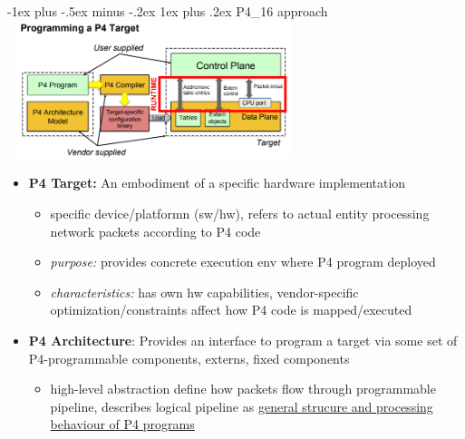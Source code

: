 \documentclass[10pt,landscape]{article}
\makeatletter
\renewcommand{\subsubsection}{\@startsection{subsubsection}{3}{0mm}%
                                {-1ex plus -.5ex minus -.2ex}%
                                {1ex plus .2ex}%
                                {\normalfont\small\bfseries}}
\makeatother
\begin{document}
\begin{multicols*}{3}
\subsubsection{P4\_16 approach}
\includegraphics*[width=8.5cm, height=4cm]{images/programmingp4target.PNG}
\begin{itemize}[topsep=0pt,noitemsep,wide=0pt, leftmargin=\dimexpr{} + 2\relax]
  \item \textbf{P4 Target:} An embodiment of a specific hardware implementation
  \begin{itemize}[topsep=0pt,noitemsep,wide=0pt, leftmargin=\dimexpr{} + 2\relax]
    \item specific device/platformn (sw/hw), refers to actual entity processing network packets according to P4 code
    \item \textit{purpose:} provides concrete execution env where P4 program deployed
    \item \textit{characteristics:} has own hw capabilities, vendor-specific optimization/constraints affect how P4 code is mapped/executed
  \end{itemize}
  \item \textbf{P4 Architecture}: Provides an interface to program a target via some set of P4-programmable components, externs, fixed components
  \begin{itemize}[topsep=0pt,noitemsep,wide=0pt, leftmargin=\dimexpr{} + 2\relax]
    \item high-level abstraction define how packets flow through programmable pipeline, describes logical pipeline as \underline{general strucure and processing behaviour of P4 programs}
  \end{itemize}
\end{itemize}


\end{multicols*}
\end{document}
